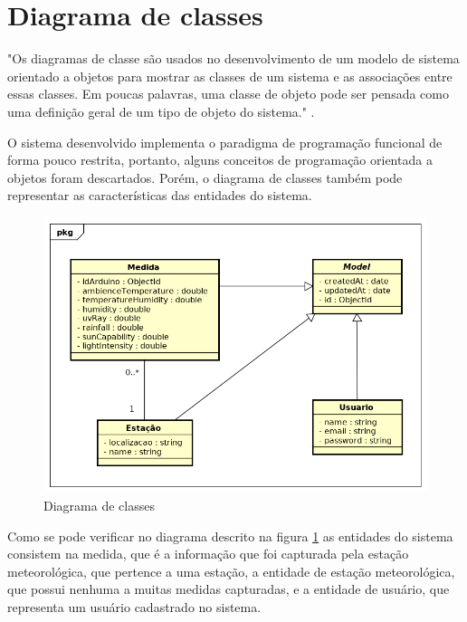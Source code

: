 \section{Diagrama de classes}

"Os diagramas de classe são usados no desenvolvimento de um modelo de sistema orientado a objetos para mostrar as classes de um sistema e as associações entre essas classes. Em poucas palavras, uma classe de objeto pode ser pensada como uma definição geral de um tipo de objeto do sistema." \cite{engenharia_software_sommerville}.

O sistema desenvolvido implementa o paradigma de programação funcional de forma pouco restrita, portanto, alguns conceitos de programação orientada a objetos foram descartados. Porém, o diagrama de classes também pode representar as características das entidades do sistema.

\begin{center}
\begin{figure}[H]
    \centering
    \caption{Diagrama de classes \label{fig:figure_diagrama_classe}}
    \includegraphics[scale=0.5]{diagrams/classe.png}
    \hfill
{}
\end{figure}
\end{center}

Como se pode verificar no diagrama descrito na figura \ref{fig:figure_diagrama_classe} as entidades do sistema consistem na medida, que é a informação que foi capturada pela estação meteorológica, que pertence a uma estação, a entidade de estação meteorológica, que possui nenhuma a muitas medidas capturadas, e a entidade de usuário, que representa um usuário cadastrado no sistema.

